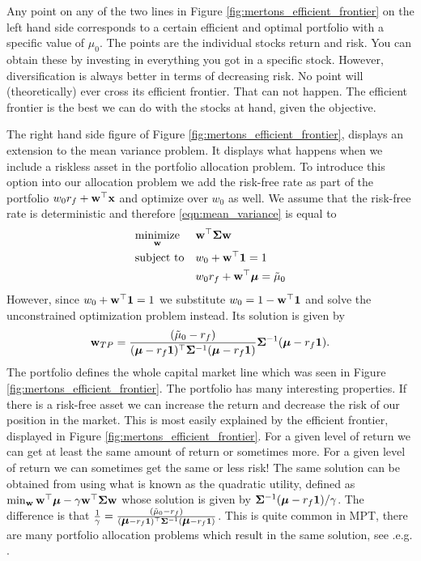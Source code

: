 \documentclass[]{book}\usepackage{knitr}
\begin{document}
Any point on any of the two lines in Figure \ref{fig:mertons_efficient_frontier} on the left hand side corresponds to a certain efficient and optimal portfolio with a specific value of $\mu_0$. The points are the individual stocks return and risk. You can obtain these by investing in everything you got in a specific stock. However, diversification is always better in terms of decreasing risk. No point will (theoretically) ever cross its efficient frontier. That can not happen. The efficient frontier is the best we can do with the stocks at hand, given the objective.

The right hand side figure of Figure \ref{fig:mertons_efficient_frontier}, displays an extension to the mean variance problem. It displays what happens when we include a riskless asset in the portfolio allocation problem. To introduce this option into our allocation problem we add the risk-free rate as part of the portfolio $w_0 r_f + \mathbf{w}^\top \mathbf{x}$ and optimize over $w_0$ as well. We assume that the risk-free rate is deterministic and therefore \eqref{eqn:mean_variance} is equal to 
\begin{equation}\label{eqn:mean_variance_riskfree}
\begin{aligned}
& \underset{\mathbf{w}}{\text{minimize}} 
& & \mathbf{w}^\top \mathbf{\Sigma} \mathbf{w} \\
& \text{subject to}
& & w_0 + \mathbf{w}^\top \mathbf{1} = 1 \\
& && w_0 r_f + \mathbf{w}^\top \mbox{\boldmath$\mu$} = \tilde\mu_0 \\
\end{aligned}
\end{equation}
However, since $w_0 + \mathbf{w}^\top \mathbf{1}=1$ we substitute $w_0=1-\mathbf{w}^\top \mathbf{1}$ and solve the unconstrained optimization problem instead. Its solution is given by 
\begin{equation}\label{eqn:w_mean_variance_riskfree}
  \mathbf{w}_{TP} = \frac{(\tilde\mu_0-r_f)}{(\mbox{\boldmath$\mu$}-r_f \mathbf{1})^\top \mathbf{\Sigma}^{-1} (\mbox{\boldmath$\mu$}-r_f \mathbf{1})} \mathbf{\Sigma}^{-1} (\mbox{\boldmath$\mu$}-r_f \mathbf{1}).
\end{equation}
The portfolio defines the whole capital market line which was seen in Figure \ref{fig:mertons_efficient_frontier}. The portfolio has many interesting properties. If there is a risk-free asset we can increase the return and decrease the risk of our position in the market. This is most easily explained by the efficient frontier, displayed in Figure \ref{fig:mertons_efficient_frontier}. For a given level of return we can get at least the same amount of return or sometimes more. For a given level of return we can sometimes get the same or less risk! The same solution can be obtained from using what is known as the quadratic utility, defined as $\min_{\mathbf{w}} \mathbf{w}^\top \mbox{\boldmath$\mu$} - \gamma \mathbf{w}^\top \mathbf{\Sigma} \mathbf{w}$ whose solution is given by $\mathbf{\Sigma}^{-1} (\mbox{\boldmath$\mu$}-r_f \mathbf{1})/\gamma$. The difference is that $\frac{1}{\gamma} = \frac{(\tilde\mu_0-r_f)}{(\mbox{\boldmath$\mu$}-r_f \mathbf{1})^\top \mathbf{\Sigma}^{-1} (\mbox{\boldmath$\mu$}-r_f \mathbf{1})}$. This is quite common in MPT, there are many portfolio allocation problems which result in the same solution, see .e.g. \citet{bodnar2013equivalence}.
\end{document}
